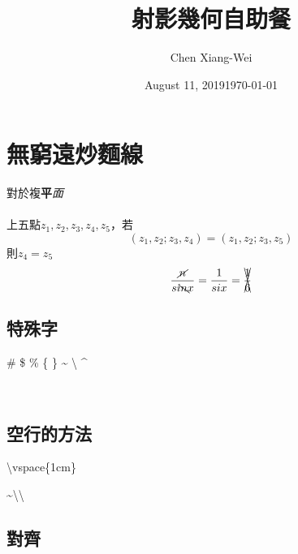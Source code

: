 \RaggedRight
\setlength{\parindent}{2em} %
\newpage

\title{射影幾何自助餐} %
\author{Chen Xiang-Wei} %
\date{August 11, 2019}
\date{\today}%
\maketitle
\thispagestyle{fancy}
\raggedright
{}
\tableofcontents  %

\setcounter{section}{-1}

\section{無窮遠炒麵線}
\pro
{\color[RGB]{0,255,200}對於}{\color{blue}複}\textbf{平}\textit{面}
~\\%
~\\%
上五點$z_{1}, z_{2}, z_{3},z_{4},z_{5}$，若\\
\[(z_{1},z_{2};z_{3},z_{4})=(z_{1},z_{2};z_{3},z_5)\]
則$z_{4}=z_{5}$\\


\pro 
$$
\frac{\cancel{n}}{si\bcancel{n} x}=\frac{1}{six}=\xcancel{\frac{1}{6}}
$$

\subsection[short]{特殊字}

\#
\$
\%
\{
\}
\~{}
\textbackslash
\^{}

\\

\subsection{空行的方法}

\textbackslash vspace\{1cm\}
\vspace{1cm}

\~{}\textbackslash\textbackslash
~\\%

\subsection[short]{對齊}


